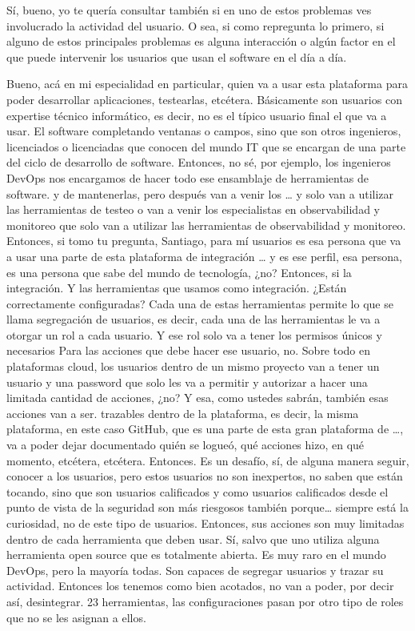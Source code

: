 \begin{description}[leftmargin=0cm, labelsep=0.5cm]
    \item[\textbf{MOCIULSKY SANTIAGO:}] Sí, bueno, yo te quería consultar también si en uno de estos problemas ves involucrado la actividad del usuario. O sea, si como repregunta lo primero, si alguno de estos principales problemas es alguna interacción o algún factor en el que puede intervenir los usuarios que usan el software en el día a día.

    \item[\textbf{VILLARINO PABLO RODOLFO:}] Bueno, acá en mi especialidad en particular, quien va a usar esta plataforma para poder desarrollar aplicaciones, testearlas, etcétera. Básicamente son usuarios con expertise técnico informático, es decir, no es el típico usuario final el que va a usar. El software completando ventanas o campos, sino que son otros ingenieros, licenciados o licenciadas que conocen del mundo IT que se encargan de una parte del ciclo de desarrollo de software. Entonces, no sé, por ejemplo, los ingenieros DevOps nos encargamos de hacer todo ese ensamblaje de herramientas de software. y de mantenerlas, pero después van a venir los … y solo van a utilizar las herramientas de testeo o van a venir los especialistas en observabilidad y monitoreo que solo van a utilizar las herramientas de observabilidad y monitoreo. Entonces, si tomo tu pregunta, Santiago, para mí usuarios es esa persona que va a usar una parte de esta plataforma de integración … y es ese perfil, esa persona, es una persona que sabe del mundo de tecnología, ¿no? Entonces, si la integración. Y las herramientas que usamos como integración. ¿Están correctamente configuradas? Cada una de estas herramientas permite lo que se llama segregación de usuarios, es decir, cada una de las herramientas le va a otorgar un rol a cada usuario. Y ese rol solo va a tener los permisos únicos y necesarios Para las acciones que debe hacer ese usuario, no. Sobre todo en plataformas cloud, los usuarios dentro de un mismo proyecto van a tener un usuario y una password que solo les va a permitir y autorizar a hacer una limitada cantidad de acciones, ¿no? Y esa, como ustedes sabrán, también esas acciones van a ser. trazables dentro de la plataforma, es decir, la misma plataforma, en este caso GitHub, que es una parte de esta gran plataforma de …, va a poder dejar documentado quién se logueó, qué acciones hizo, en qué momento, etcétera, etcétera. Entonces. Es un desafío, sí, de alguna manera seguir, conocer a los usuarios, pero estos usuarios no son inexpertos, no saben que están tocando, sino que son usuarios calificados y como usuarios calificados desde el punto de vista de la seguridad son más riesgosos también porque… siempre está la curiosidad, no de este tipo de usuarios. Entonces, sus acciones son muy limitadas dentro de cada herramienta que deben usar. Sí, salvo que uno utiliza alguna herramienta open source que es totalmente abierta. Es muy raro en el mundo DevOps, pero la mayoría todas. Son capaces de segregar usuarios y trazar su actividad. Entonces los tenemos como bien acotados, no van a poder, por decir así, desintegrar. 23 herramientas, las configuraciones pasan por otro tipo de roles que no se les asignan a ellos.


\end{description}
